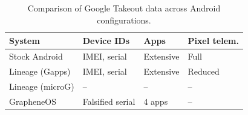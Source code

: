 \begin{table}
	\caption{Comparison of Google Takeout data across Android configurations.}
	\label{tab:takeout-comparison}

	\footnotesize
	\begin{tabular}{@{}p{}p{}p{}p{}@{}}
		\toprule
		System & Device IDs & Apps & Pixel telem. \\
		\midrule
		Stock Android & IMEI, serial & Extensive & Full \\
		Lineage (Gapps) & IMEI, serial & Extensive & Reduced \\
		Lineage (microG) & -- & -- & -- \\
		GrapheneOS & Falsified serial & 4 apps & -- \\
		\bottomrule
	\end{tabular}
\end{table}
